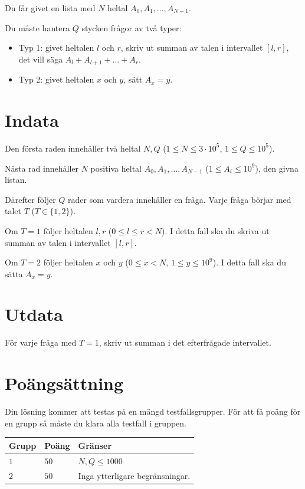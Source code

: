 Du får givet en lista med $N$ heltal $A_0, A_1, \dots, A_{N-1}$.

Du måste hantera $Q$ stycken frågor av två typer:
\begin{itemize}
  \item Typ 1: givet heltalen $l$ och $r$, skriv ut summan av talen i intervallet $[l,r]$, det vill säga $A_l + A_{l+1} + \dots + A_r$.
  \item Typ 2: givet heltalen $x$ och $y$, sätt $A_x = y$.
\end{itemize}

\section*{Indata}
Den första raden innehåller två heltal $N, Q$ ($1 \leq N \leq 3 \cdot 10^5$, $1 \leq Q \leq 10^5$).

Nästa rad innehåller $N$ positiva heltal $A_0, A_1, \dots, A_{N-1}$ ($1 \leq A_i \leq 10^9$),
den givna listan.

Därefter följer $Q$ rader som vardera innehåller en fråga. Varje fråga börjar med talet $T$ ($T \in \{1,2\}$).

Om $T=1$ följer heltalen $l, r$ ($0 \leq l \leq r < N$).
I detta fall ska du skriva ut summan av talen i intervallet $[l,r]$.

Om $T=2$ följer heltalen $x$ och $y$ ($0 \leq x < N$, $1 \leq y \leq 10^9$).
I detta fall ska du sätta $A_x = y$.


\section*{Utdata}
För varje fråga med $T=1$, skriv ut summan i det efterfrågade intervallet.

\section*{Poängsättning}
Din lösning kommer att testas på en mängd testfallsgrupper.
För att få poäng för en grupp så måste du klara alla testfall i gruppen.

\noindent
\begin{tabular}{| l | l | p{12cm} |}
\hline
  \textbf{Grupp} & \textbf{Poäng} & \textbf{Gränser} \\ \hline
  $1$    & $50$       &  $N,Q \leq 1000$ \\ \hline
  $2$    & $50$       &  Inga ytterligare begränsningar. \\ \hline
\end{tabular}
